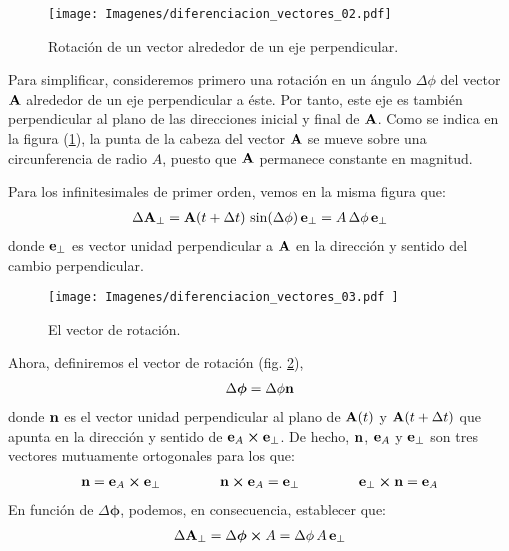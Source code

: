 \documentclass[12pt]{article}
\begin{document}
\begin{figure}[H]
    \centering
    \texttt{[image: Imagenes/diferenciacion\_vectores\_02.pdf]}
    \caption{Rotación de un vector alrededor de un eje perpendicular.}
    \label{fig:figura_01_20}
\end{figure}
Para simplificar, consideremos primero una rotación en un ángulo $\Delta \phi$ del vector $\vb{A}$ alrededor de un eje perpendicular a éste. Por tanto, este eje es también perpendicular al plano de las direcciones inicial y final de $\vb{A}$. Como se indica en la figura (\ref{fig:figura_01_20}), la punta de la cabeza del vector $\vb{A}$ se mueve sobre una circunferencia de radio $A$, puesto que $\vb{A}$ permanece constante en magnitud. 
\par
Para los infinitesimales de primer orden, vemos en la misma figura que:
\begin{align}
    \Delta \vb{A}_{\perp} =  \vb{A} (t + \Delta t) \, \sin (\Delta \phi) \, \vb{e}_{\perp} = A \, \Delta \phi \, \vb{e}_{\perp}
    \label{eq:ecuacion_01_67}
\end{align}
donde $\vb{e}_\perp$ es vector unidad perpendicular a $\vb{A}$ en la dirección y sentido del cambio perpendicular. 
\begin{figure}[H]
    \centering
    \texttt{[image: Imagenes/diferenciacion\_vectores\_03.pdf   ]}
    \caption{El vector de rotación.}
    \label{fig:figura_01_21}
\end{figure}
Ahora, definiremos el vector de rotación (fig. \ref{fig:figura_01_21}),
\begin{align}
    \Delta \bm{\phi} = \Delta \phi \vb{n}
    \label{eq:ecuacion_01_68}
\end{align}
donde $\vb{n}$ es el vector unidad perpendicular al plano de $\vb{A} (t)$ y $\vb{A} (t + \Delta t)$ que apunta en la dirección y sentido de $\vb{e}_{A} \cp \vb{e}_{\perp}$. De hecho, $\vb{n}$, $\vb{e}_{A}$ y $\vb{e}_{\perp}$ son tres vectores mutuamente ortogonales para los que:
\begin{align}
    \vb{n} = \vb{e}_{A} \cp \vb{e}_{\perp} \hspace{1.5cm} \vb{n} \cp \vb{e}_{A} = \vb{e}_{\perp} \hspace{1.5cm} \vb{e}_{\perp} \cp \vb{n} = \vb{e}_{A}
    \label{eq:ecuacion_01_69}
\end{align} 
En función de $\Delta \bm{\phi}$, podemos, en consecuencia, establecer que:
\begin{align}
    \Delta \vb{A}_{\perp} = \Delta \bm{\phi} \cp A = \Delta \phi \, A \, \vb{e}_{\perp}
    \label{eq:ecuacion_01_70}
\end{align}
\end{document}
